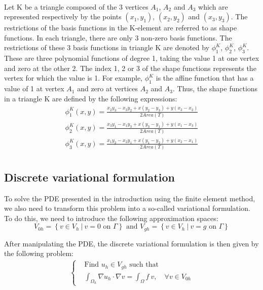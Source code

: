 \documentclass[english,10pt,a4paper]{article}
\begin{document}
\paragraph{}
Let K be a triangle composed of the 3 vertices $A_1$, $A_2$ and $A_3$ which are represented respectively by the points $(x_1,y_1)$, $(x_2,y_2)$ and $(x_3,y_3)$.
The restrictions of the basis functions in the K-element are referred to as shape functions.
In each triangle, there are only 3 non-zero basis functions. The restrictions of these 3 basis functions in triangle K are denoted by $\phi_1^K$, $\phi_2^K$, $\phi_3^K$. These are
three polynomial functions of degree 1, taking the value 1 at one vertex and zero at the other 2.
The index 1, 2 or 3 of the shape functions represents the vertex for which the value is 1.
For example, $\phi_1^K$ is the affine function that has a value of 1 at vertex $A_1$ and zero at vertices $A_2$ and $A_3$.
Thus, the shape functions in a triangle K are defined by the following expressions:
\begin{eqnarray*}
 \phi_1^K(x,y) = \frac{x_2 y_3 - x_3 y_2 + x (y_2-y_3)+y(x_3-x_2)}{2 Area(T)} \\
 \phi_2^K(x,y) = \frac{x_3 y_1 - x_1 y_3 + x (y_3-y_1)+y(x_1-x_3)}{2 Area(T)} \\
 \phi_3^K(x,y) = \frac{x_1 y_2 - x_2 y_1 + x (y_1-y_2)+y(x_2-x_1)}{2 Area(T)} \\
\end{eqnarray*}



\subsection{Discrete variational formulation}

To solve the PDE presented in the introduction using the finite element method, we also need to transform this problem into a so-called variational formulation.
To do this, we need to introduce the following approximation spaces:
\begin{equation*}
  V_{0h} = \left\{ v \in V_h \ | \ v=0 \text{ on } \Gamma \right\} \text{ and } V_{gh} = \left\{ v \in V_h \ | \ v=g \text{ on } \Gamma \right\}
\end{equation*}

After manipulating the PDE, the discrete variational formulation is then given by the following problem:
\begin{eqnarray}
\left\{
  \begin{aligned}
     &\text{Find $u_h \in V_{gh}$ such that } \\
    &\int_{\Omega_h} \nabla u_h \cdot \nabla v = \int_{\Omega} f \ v, \quad \forall v \in V_{0h}
  \end{aligned}
  \right.
\end{eqnarray}
\end{document}
